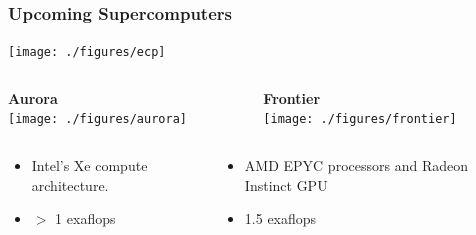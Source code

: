 \begin{frame}
  \frametitle{Upcoming Supercomputers}
    \begin{center}
      \texttt{[image: ./figures/ecp]} \\
    \end{center}
  \begin{columns}[T]
    \begin{column}{0.49\textwidth}
      \begin{center}
        {\bf Aurora}\\
        \texttt{[image: ./figures/aurora]}
      \end{center}
    \end{column}
    \begin{column}{0.49\textwidth}
      \begin{center}
        {\bf Frontier}\\
        \texttt{[image: ./figures/frontier]}
      \end{center}
    \end{column}
  \end{columns}
  \begin{columns}[T]
    \begin{column}{0.49\textwidth}
    \begin{itemize}
      \item Intel’s Xe compute architecture.
      \item $>$ 1 exaflops
    \end{itemize}
    \end{column}
    \begin{column}{0.49\textwidth}
      \begin{itemize}
        \item AMD EPYC processors and Radeon Instinct GPU
        \item 1.5 exaflops
      \end{itemize}
    \end{column}
  \end{columns}
\end{frame}

